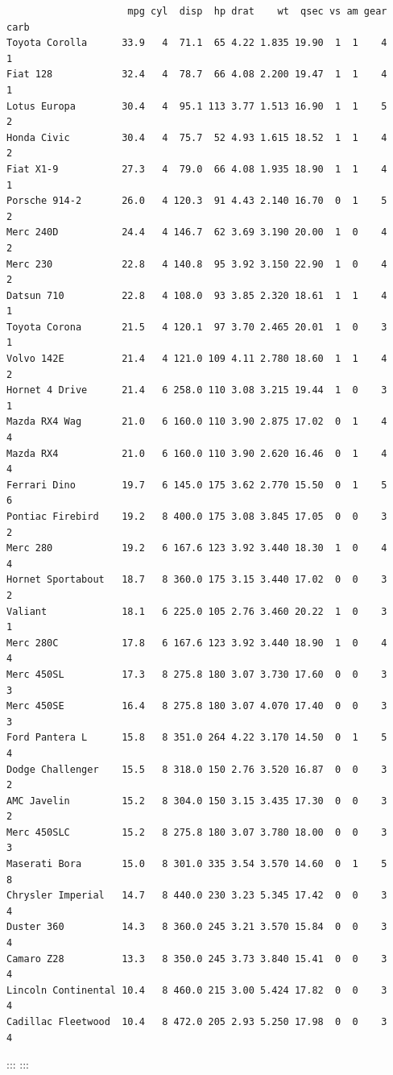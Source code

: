 \documentclass[
  letterpaper,
  DIV=11,
  numbers=noendperiod]{scrreprt}
\begin{document}
\begin{enumerate}
\begin{enumerate}
\begin{verbatim}
                     mpg cyl  disp  hp drat    wt  qsec vs am gear carb
Toyota Corolla      33.9   4  71.1  65 4.22 1.835 19.90  1  1    4    1
Fiat 128            32.4   4  78.7  66 4.08 2.200 19.47  1  1    4    1
Lotus Europa        30.4   4  95.1 113 3.77 1.513 16.90  1  1    5    2
Honda Civic         30.4   4  75.7  52 4.93 1.615 18.52  1  1    4    2
Fiat X1-9           27.3   4  79.0  66 4.08 1.935 18.90  1  1    4    1
Porsche 914-2       26.0   4 120.3  91 4.43 2.140 16.70  0  1    5    2
Merc 240D           24.4   4 146.7  62 3.69 3.190 20.00  1  0    4    2
Merc 230            22.8   4 140.8  95 3.92 3.150 22.90  1  0    4    2
Datsun 710          22.8   4 108.0  93 3.85 2.320 18.61  1  1    4    1
Toyota Corona       21.5   4 120.1  97 3.70 2.465 20.01  1  0    3    1
Volvo 142E          21.4   4 121.0 109 4.11 2.780 18.60  1  1    4    2
Hornet 4 Drive      21.4   6 258.0 110 3.08 3.215 19.44  1  0    3    1
Mazda RX4 Wag       21.0   6 160.0 110 3.90 2.875 17.02  0  1    4    4
Mazda RX4           21.0   6 160.0 110 3.90 2.620 16.46  0  1    4    4
Ferrari Dino        19.7   6 145.0 175 3.62 2.770 15.50  0  1    5    6
Pontiac Firebird    19.2   8 400.0 175 3.08 3.845 17.05  0  0    3    2
Merc 280            19.2   6 167.6 123 3.92 3.440 18.30  1  0    4    4
Hornet Sportabout   18.7   8 360.0 175 3.15 3.440 17.02  0  0    3    2
Valiant             18.1   6 225.0 105 2.76 3.460 20.22  1  0    3    1
Merc 280C           17.8   6 167.6 123 3.92 3.440 18.90  1  0    4    4
Merc 450SL          17.3   8 275.8 180 3.07 3.730 17.60  0  0    3    3
Merc 450SE          16.4   8 275.8 180 3.07 4.070 17.40  0  0    3    3
Ford Pantera L      15.8   8 351.0 264 4.22 3.170 14.50  0  1    5    4
Dodge Challenger    15.5   8 318.0 150 2.76 3.520 16.87  0  0    3    2
AMC Javelin         15.2   8 304.0 150 3.15 3.435 17.30  0  0    3    2
Merc 450SLC         15.2   8 275.8 180 3.07 3.780 18.00  0  0    3    3
Maserati Bora       15.0   8 301.0 335 3.54 3.570 14.60  0  1    5    8
Chrysler Imperial   14.7   8 440.0 230 3.23 5.345 17.42  0  0    3    4
Duster 360          14.3   8 360.0 245 3.21 3.570 15.84  0  0    3    4
Camaro Z28          13.3   8 350.0 245 3.73 3.840 15.41  0  0    3    4
Lincoln Continental 10.4   8 460.0 215 3.00 5.424 17.82  0  0    3    4
Cadillac Fleetwood  10.4   8 472.0 205 2.93 5.250 17.98  0  0    3    4
\end{verbatim}

    ::: :::
  \end{enumerate}
\end{enumerate}
\end{document}
